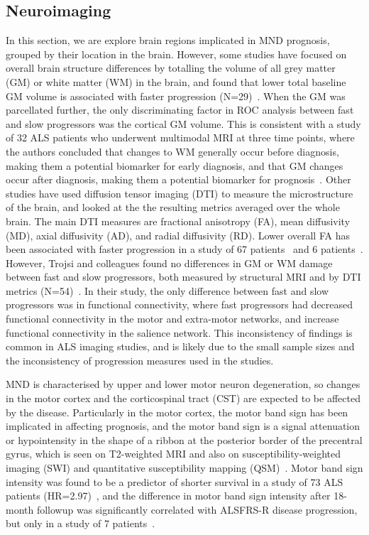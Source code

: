 \subsection{Neuroimaging}

In this section, we are explore brain regions implicated in MND prognosis, grouped by their location in the brain.
However, some studies have focused on overall brain structure differences by totalling the volume of all grey matter (GM) or white matter (WM) in the brain, and found that lower total baseline GM volume is associated with faster progression (N=29)~\cite{elmendiliAssociationBrainUpper2023}.
When the GM was parcellated further, the only discriminating factor in ROC analysis between fast and slow progressors was the cortical GM volume.
This is consistent with a study of 32 ALS patients who underwent multimodal MRI at three time points, where the authors concluded that changes to WM generally occur before diagnosis, making them a potential biomarker for early diagnosis, and that GM changes occur after diagnosis, making them a potential biomarker for prognosis~\cite{bedeLongitudinalStructuralChanges2018}.
Other studies have used diffusion tensor imaging (DTI) to measure the microstructure of the brain, and looked at the the resulting metrics averaged over the whole brain.
The main DTI measures are fractional anisotropy (FA), mean diffusivity (MD), axial diffusivity (AD), and radial diffusivity (RD).
Lower overall FA has been associated with faster progression in a study of 67 patients~\cite{sendaStructuralMRICorrelates2017} and 6 patients~\cite{baldaranovLongitudinalDiffusionTensor2017}.
However, Trojsi and colleagues found no differences in GM or WM damage between fast and slow progressors, both measured by structural MRI and by DTI metrics (N=54)~\cite{trojsiRestingStateFunctional2021}.
In their study, the only difference between fast and slow progressors was in functional connectivity, where fast progressors had decreased functional connectivity in the motor and extra-motor networks, and increase functional connectivity in the salience network.
This inconsistency of findings is common in ALS imaging studies, and is likely due to the small sample sizes and the inconsistency of progression measures used in the studies.

MND is characterised by upper and lower motor neuron degeneration, so changes in the motor cortex and the corticospinal tract (CST) are expected to be affected by the disease.
Particularly in the motor cortex, the motor band sign has been implicated in affecting prognosis, and the motor band sign is a signal attenuation or hypointensity in the shape of a ribbon at the posterior border of the precentral gyrus, which is seen on T2-weighted MRI and also on susceptibility-weighted imaging (SWI) and quantitative susceptibility mapping (QSM)~\cite{bollHypointensityMotorCortex2019}.
Motor band sign intensity was found to be a predictor of shorter survival in a study of 73 ALS patients (HR=2.97)~\cite{rizzoDiagnosticPrognosticValue2020}, and the difference in motor band sign intensity after 18-month followup was significantly correlated with ALSFRS-R disease progression, but only in a study of 7 patients~\cite{bollHypointensityMotorCortex2019}.

